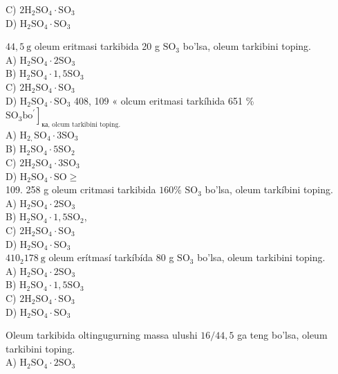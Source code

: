 C) $2 \mathrm{H}_{2} \mathrm{SO}_{4} \cdot \mathrm{SO}_{3}$\\
D) $\mathrm{H}_{2} \mathrm{SO}_{4} \cdot \mathrm{SO}_{3}$
  \item $44,5 \mathrm{~g}$ oleum eritmasi tarkibida 20 g $\mathrm{SO}_{3}$ bo'lsa, oleum tarkibini toping.\\
A) $\mathrm{H}_{2} \mathrm{SO}_{4} \cdot 2 \mathrm{SO}_{3}$\\
B) $\mathrm{H}_{2} \mathrm{SO}_{4} \cdot 1,5 \mathrm{SO}_{3}$\\
C) $2 \mathrm{H}_{2} \mathrm{SO}_{4} \cdot \mathrm{SO}_{3}$\\
D) $\mathrm{H}_{2} \mathrm{SO}_{4} \cdot \mathrm{SO}_{3}$
408, 109 « olcum eritmasi tarkíhida 651 \% $\left.\mathrm{SO}_{3} \mathrm{bo}^{\prime}\right]_{\text {ка, olcum tarkibini toping. }}$\\
A) $\mathrm{H}_{2,} \mathrm{SO}_{4} \cdot 3 \mathrm{SO}_{3}$\\
B) $\mathrm{H}_{2} \mathrm{SO}_{4} \cdot 5 \mathrm{SO}_{2}$\\
C) $2 \mathrm{H}_{2} \mathrm{SO}_{4} \cdot 3 \mathrm{SO}_{3}$\\
D) $\mathrm{H}_{2} \mathrm{SO}_{4} \cdot \mathrm{SO} \geqslant$\\
109. 258 g oleum critmasi tarkibida $160 \%$ $\mathrm{SO}_{3}$ bo'lsa, oleum tarkíbini toping.\\
A) $\mathrm{H}_{2} \mathrm{SO}_{4} \cdot 2 \mathrm{SO}_{3}$\\
B) $\mathrm{H}_{2} \mathrm{SO}_{4} \cdot 1,5 \mathrm{SO}_{2}$,\\
C) $2 \mathrm{H}_{2} \mathrm{SO}_{4} \cdot \mathrm{SO}_{3}$\\
D) $\mathrm{H}_{2} \mathrm{SO}_{4} \cdot \mathrm{SO}_{3}$\\
$410_{2} 178 \mathrm{~g}$ oleum erítmasí tarkíbída 80 g $\mathrm{SO}_{3}$ bo'lsa, oleum tarkibini toping.\\
A) $\mathrm{H}_{2} \mathrm{SO}_{4} \cdot 2 \mathrm{SO}_{3}$\\
B) $\mathrm{H}_{2} \mathrm{SO}_{4} \cdot 1,5 \mathrm{SO}_{3}$\\
C) $2 \mathrm{H}_{2} \mathrm{SO}_{4} \cdot \mathrm{SO}_{3}$\\
D) $\mathrm{H}_{2} \mathrm{SO}_{4} \cdot \mathrm{SO}_{3}$
  \item Oleum tarkibida oltingugurning massa ulushi $16 / 44,5$ ga teng bo'lsa, oleum tarkibini toping.\\
A) $\mathrm{H}_{2} \mathrm{SO}_{4} \cdot 2 \mathrm{SO}_{3}$\\

